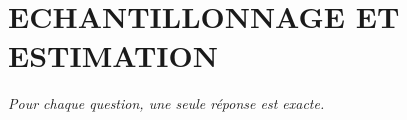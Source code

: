 
\section*{\textcolor{chapcolor}{\MakeUppercase{Echantillonnage et estimation}}}

\begin{center}
\textit{Pour chaque question, une seule réponse est exacte.}
\end{center}

